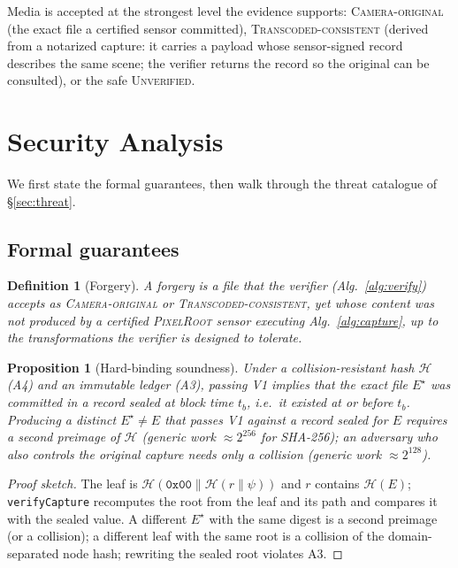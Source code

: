 \documentclass[journal]{IEEEtran}
\newcommand{\pr}{\textup{\textsc{PixelRoot}}}
\newtheorem{proposition}{Proposition}
\newtheorem{definition}{Definition}
\begin{document}
Media is accepted at the strongest level the evidence supports:
\textsc{Camera-original} (the exact file a certified sensor committed),
\textsc{Transcoded-consistent} (derived from a notarized capture: it carries a
payload whose sensor-signed record describes the same scene; the verifier returns
the record so the original can be consulted), or the safe \textsc{Unverified}.

\section{Security Analysis}\label{sec:security}

We first state the formal guarantees, then walk through the threat catalogue of
\S\ref{sec:threat}.

\subsection{Formal guarantees}

\begin{definition}[Forgery]
A forgery is a file that the verifier (Alg.~\ref{alg:verify}) accepts as
\textsc{Camera-original} or \textsc{Transcoded-consistent}, yet whose content was
not produced by a certified \pr{} sensor executing Alg.~\ref{alg:capture}, up to
the transformations the verifier is designed to tolerate.
\end{definition}

\begin{proposition}[Hard-binding soundness]\label{prop:v1}
Under a collision-resistant hash $\mathcal{H}$ \emph{(A4)} and an immutable
ledger \emph{(A3)}, passing V1 implies that the exact file $E^\star$ was committed
in a record sealed at block time $t_b$, i.e.\ it existed at or before $t_b$.
Producing a distinct $E^\star\neq E$ that passes V1 against a record sealed for
$E$ requires a second preimage of $\mathcal{H}$ (generic work $\approx\!2^{256}$ for
\mbox{SHA-256}); an adversary who also controls the original capture needs only a
collision (generic work $\approx\!2^{128}$).
\end{proposition}
\begin{proof}[Proof sketch]
The leaf is $\mathcal H(\texttt{0x00}\|\mathcal H(r\|\psi))$ and $r$ contains
$\mathcal H(E)$; \texttt{verifyCapture} recomputes the root from the leaf and its
path and compares it with the sealed value. A different $E^\star$ with the same
digest is a second preimage (or a collision); a different leaf with the same
root is a collision of the domain-separated node hash; rewriting the sealed root
violates A3.
\end{proof}
\end{document}
